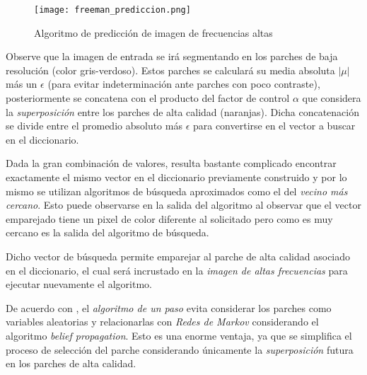 \begin{figure}[H]
    \texttt{[image:  freeman\_prediccion.png]}
    \centering
    \caption{ Algoritmo de predicción de imagen de frecuencias altas }
    \label{fig:fr_prediccion}
\end{figure}

Observe que la imagen de entrada se irá segmentando en los parches de baja 
resolución (color gris-verdoso). Estos parches se calculará su media absoluta 
$|\mu|$ más un $\epsilon$ (para evitar indeterminación ante parches con poco
contraste), posteriormente se concatena con el producto del factor de control 
$\alpha$ que considera la \emph{superposición} entre los parches de alta calidad
(naranjas). Dicha concatenación se divide entre el promedio absoluto más $\epsilon$
para convertirse en el vector a buscar en el diccionario. 

Dada la gran combinación de valores, resulta bastante complicado encontrar 
exactamente el mismo vector en el diccionario previamente construido y por
lo mismo se utilizan algoritmos de búsqueda aproximados como el del \emph{vecino
más cercano}. Esto puede observarse en la salida del algoritmo al observar que el 
vector emparejado tiene un pixel de color diferente al solicitado pero como 
es muy cercano es la salida del algoritmo de búsqueda. 

Dicho vector de búsqueda permite emparejar al parche de alta calidad asociado
en el diccionario, el cual será incrustado en la \emph{imagen de altas frecuencias}
para ejecutar nuevamente el algoritmo. 

De acuerdo con \cite{freeman}, el \emph{algoritmo de un paso} evita considerar
los parches como variables aleatorias y relacionarlas con \emph{Redes de Markov}
considerando el algoritmo \emph{belief propagation}. Esto es una enorme ventaja,
ya que se simplifica el proceso de selección del parche considerando 
únicamente la \emph{superposición} futura en los parches de alta calidad. 